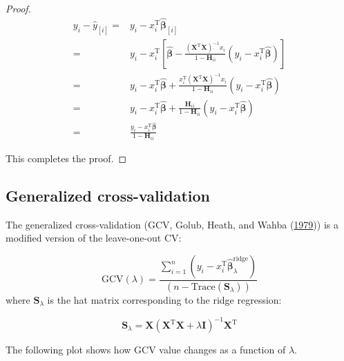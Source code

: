 \documentclass[
]{book}
\newenvironment{Shaded}{\begin{snugshade}}{\end{snugshade}}
\newcommand{\AttributeTok}[1]{\textcolor[rgb]{0.13,0.29,0.53}{#1}}
\newcommand{\CommentTok}[1]{\textcolor[rgb]{0.56,0.35,0.01}{\textit{#1}}}
\newcommand{\DecValTok}[1]{\textcolor[rgb]{0.00,0.00,0.81}{#1}}
\newcommand{\FunctionTok}[1]{\textcolor[rgb]{0.13,0.29,0.53}{\textbf{#1}}}
\newcommand{\NormalTok}[1]{#1}
\newcommand{\SpecialCharTok}[1]{\textcolor[rgb]{0.81,0.36,0.00}{\textbf{#1}}}
\newcommand{\StringTok}[1]{\textcolor[rgb]{0.31,0.60,0.02}{#1}}
\theoremstyle{definition}
\theoremstyle{definition}
\theoremstyle{definition}
\theoremstyle{definition}
\theoremstyle{remark}
\begin{document}
\begin{proof}
\begin{align}
y _i - \widehat{y}_{[i]} =& y _i - x_i^\text{T}\widehat{\boldsymbol \beta}_{[i]} \\
=& y _i - x_i^\text{T}\left[ \widehat{\boldsymbol \beta} - \frac{(\mathbf{X}^\text{T}\mathbf{X})^{-1} x_i}{1 - \mathbf{H}_{ii}} \left( y_i - x_i^\text{T}\widehat{\boldsymbol \beta} \right)  \right]\\
=& y _i - x_i^\text{T}\widehat{\boldsymbol \beta} + \frac{x_i^\text{T}(\mathbf{X}^\text{T}\mathbf{X})^{-1} x_i}{1 - \mathbf{H}_{ii}} \left( y_i - x_i^\text{T}\widehat{\boldsymbol \beta} \right)\\
=& y _i - x_i^\text{T}\widehat{\boldsymbol \beta} + \frac{\mathbf{H}_{ii}}{1 - \mathbf{H}_{ii}} \left( y_i - x_i^\text{T}\widehat{\boldsymbol \beta} \right)\\
=& \frac{y_i - x_i^\text{T}\widehat{\boldsymbol \beta}}{1 - \mathbf{H}_{ii}}
\end{align}

This completes the proof.
\end{proof}

\hypertarget{generalized-cross-validation}{%
\subsection{Generalized cross-validation}\label{generalized-cross-validation}}

The generalized cross-validation (GCV, Golub, Heath, and Wahba (\protect\hyperlink{ref-golub1979generalized}{1979})) is a modified version of the leave-one-out CV:

\[\text{GCV}(\lambda) = \frac{\sum_{i=1}^n (y_i - x_i^\text{T}\widehat{\boldsymbol \beta}^\text{ridge}_\lambda)}{(n - \text{Trace}(\mathbf{S}_\lambda))}\]
where \(\mathbf{S}_\lambda\) is the hat matrix corresponding to the ridge regression:

\[\mathbf{S}_\lambda = \mathbf{X}(\mathbf{X}^\text{T}\mathbf{X}+ \lambda \mathbf{I})^{-1} \mathbf{X}^\text{T}\]

The following plot shows how GCV value changes as a function of \(\lambda\).

\begin{Shaded}
\end{Shaded}
\end{document}
